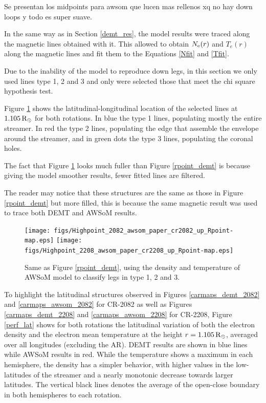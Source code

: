 \documentclass[namedreferences]{solarphysics}
\newcommand{\mrsun}{{\rm R_\odot}}
\newcommand{\Ne}{N_{\rm e}}
\def\temp#1{\textcolor{mygray}{#1}}
\begin{document}
\begin{article}
\temp{Se presentan los midpoints para awsom que lucen mas rellenos xq no hay down loops y todo es super suave.}

In the same way as in Section \ref{demt_res}, the model results were traced along the magnetic lines obtained with it. This allowed to obtain $\Ne(r)$ and $T_e(r)$ along the magnetic lines and fit them to the Equations \ref{Nfit} and \ref{Tfit}.

Due to the inability of the model to reproduce down legs, in this section we only used lines type 1, 2 and 3 and only were selected those that meet the chi square hypothesis test.

Figure \ref{rpoint_awsom} shows the latitudinal-longitudinal location of the selected lines at $1.105\,\mrsun$ for both rotations. In blue the type 1 lines, populating mostly the entire streamer. In red the type 2 lines, populating the edge that assemble the envelope around the streamer, and in green dots the type 3 lines, populating the coronal holes.

The fact that Figure \ref{rpoint_awsom} looks much fuller than Figure \ref{rpoint_demt} is because giving the model smoother results, fewer fitted lines are filtered.

The reader may notice that these structures are the same as those in Figure \ref{rpoint_demt} but more filled, this is because the same magnetic result was used to trace both DEMT and AWSoM results.


\begin{figure}[h!]
\begin{center}
\texttt{[image: figs/Highpoint\_2082\_awsom\_paper\_cr2082\_up\_Rpoint-map.eps]}
\texttt{[image: figs/Highpoint\_2208\_awsom\_paper\_cr2208\_up\_Rpoint-map.eps]}
\caption{Same as Figure \ref{rpoint_demt}, using the density and temperature of AWSoM model to classify legs in type 1, 2 and 3.}
\label{rpoint_awsom}
\end{center}
\end{figure} 


To highlight the latitudinal structures observed in Figures \ref{carmaps_demt_2082} and \ref{carmaps_awsom_2082} for CR-2082 as well as Figures \ref{carmaps_demt_2208} and \ref{carmaps_awsom_2208} for CR-2208, Figure \ref{perf_lat} shows for both rotations the latitudinal variation  of both the electron density and the electron mean temperature at the height $r=1.105\,\mrsun$, averaged over all longitudes (excluding the AR). DEMT results are shown in blue lines while AWSoM results in red. While the temperature shows a maximum in each hemisphere, the density has a simpler behavior, with higher values in the low-latitudes of the streamer and a nearly monotonic decrease towards larger latitudes. The vertical black lines denotes the average of the open-close boundary in both hemispheres to each rotation.


\end{article}
\end{document}
